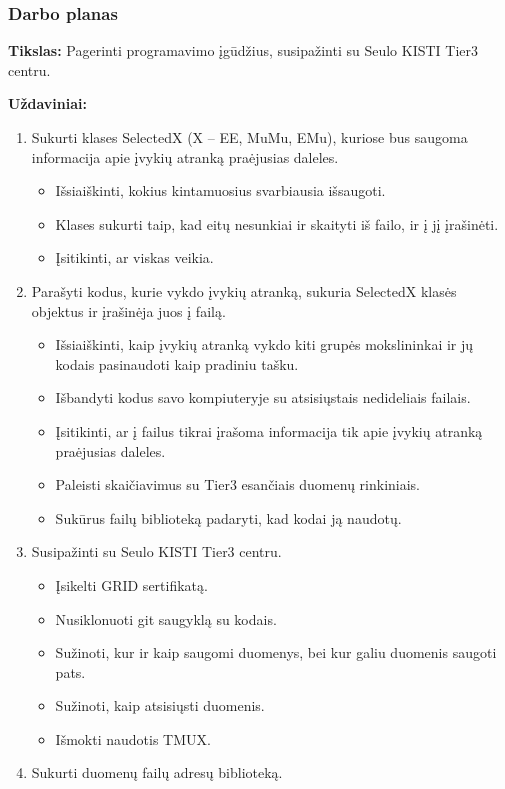 \documentclass{beamer}
\begin{document}
\begin{frame}[allowframebreaks]
\frametitle{Darbo planas}

\textbf{Tikslas:} Pagerinti programavimo įgūdžius, susipažinti su Seulo KISTI Tier3 centru.

\medskip
\textbf{Uždaviniai:}
\begin{enumerate}
	\item Sukurti klases SelectedX (X -- EE, MuMu, EMu), kuriose bus saugoma informacija apie įvykių atranką praėjusias daleles.
	\begin{itemize}
		\item Išsiaiškinti, kokius kintamuosius svarbiausia išsaugoti.
		\item Klases sukurti taip, kad eitų nesunkiai ir skaityti iš failo, ir į jį įrašinėti.
		\item Įsitikinti, ar viskas veikia.
	\end{itemize}
	\smallskip
	\item Parašyti kodus, kurie vykdo įvykių atranką, sukuria SelectedX klasės objektus ir įrašinėja juos į failą.
	\begin{itemize}
		\item Išsiaiškinti, kaip įvykių atranką vykdo kiti grupės mokslininkai ir jų kodais pasinaudoti kaip pradiniu tašku.
		\item Išbandyti kodus savo kompiuteryje su atsisiųstais nedideliais failais.
		\item Įsitikinti, ar į failus tikrai įrašoma informacija tik apie įvykių atranką praėjusias daleles.
		\item Paleisti skaičiavimus su Tier3 esančiais duomenų rinkiniais.
		\item Sukūrus failų biblioteką padaryti, kad kodai ją naudotų.
	\end{itemize}
	\item Susipažinti su Seulo KISTI Tier3 centru.
	\begin{itemize}
		\item Įsikelti GRID sertifikatą.
		\item Nusiklonuoti git saugyklą su kodais.
		\item Sužinoti, kur ir kaip saugomi duomenys, bei kur galiu duomenis saugoti pats.
		\item Sužinoti, kaip atsisiųsti duomenis.
		\item Išmokti naudotis TMUX.
	\end{itemize}
	\item Sukurti duomenų failų adresų biblioteką.
	\begin{itemize}

\end{itemize}
\end{enumerate}
\end{frame}
\end{document}
